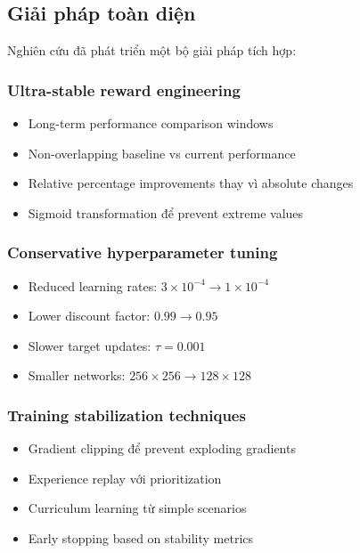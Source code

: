 \subsection{Giải pháp toàn diện}
Nghiên cứu đã phát triển một bộ giải pháp tích hợp:

\subsubsection{Ultra-stable reward engineering}
\begin{itemize}
    \item Long-term performance comparison windows

    \item Non-overlapping baseline vs current performance

    \item Relative percentage improvements thay vì absolute changes

    \item Sigmoid transformation để prevent extreme values
\end{itemize}

\subsubsection{Conservative hyperparameter tuning}
\begin{itemize}
    \item Reduced learning rates: $3 \times 10^{-4}\rightarrow 1 \times 10^{-4}$

    \item Lower discount factor: $0.99 \rightarrow 0.95$

    \item Slower target updates: $\tau = 0.001$

    \item Smaller networks: $256 \times 256 \rightarrow 128 \times 128$
\end{itemize}

\subsubsection{Training stabilization techniques}
\begin{itemize}
    \item Gradient clipping để prevent exploding gradients

    \item Experience replay với prioritization

    \item Curriculum learning từ simple scenarios

    \item Early stopping based on stability metrics
\end{itemize}

